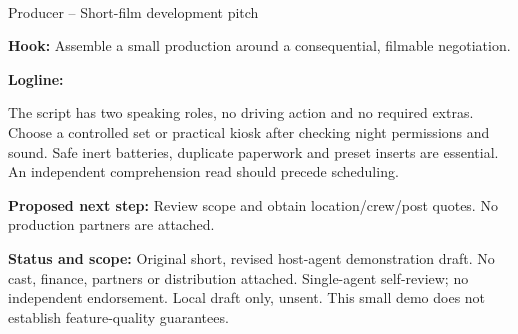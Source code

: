 \documentclass[11pt,letterpaper]{article}
\begin{document}
\begin{center}
{\Large\bfseries\sffamily \filmtitleupper}\\[6pt]
Producer -- Short-film development pitch
\end{center}
\textbf{Hook:} Assemble a small production around a consequential, filmable negotiation.

\textbf{Logline:} \filmlogline

The script has two speaking roles, no driving action and no required extras. Choose a controlled set or practical kiosk after checking night permissions and sound. Safe inert batteries, duplicate paperwork and preset inserts are essential. An independent comprehension read should precede scheduling.

\textbf{Proposed next step:} Review scope and obtain location/crew/post quotes. No production partners are attached.

\textbf{Status and scope:} Original short, revised host-agent demonstration draft. No cast, finance, partners or distribution attached. Single-agent self-review; no independent endorsement. Local draft only, unsent. This small demo does not establish feature-quality guarantees.
\end{document}
